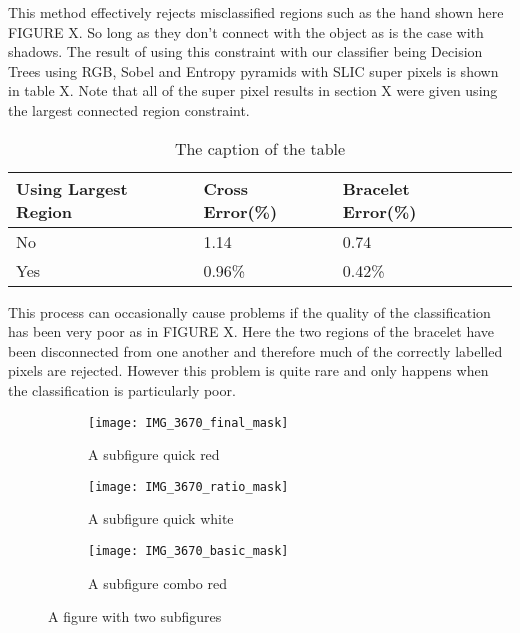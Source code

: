 \documentclass[12pt]{IIBproject}
\begin{document}
This method effectively rejects misclassified regions such as the hand shown here FIGURE X. So long as they don't connect with the object as is the case with shadows. The result of using this constraint with our classifier being Decision Trees using RGB, Sobel and Entropy pyramids with SLIC super pixels is shown in table X. Note that all of the super pixel results in section X were given using the largest connected region constraint.
\begin{table}
\begin{center}
    \begin{tabular}{ | l | l | l | p{5cm} |}
    \hline
    Using Largest Region & Cross Error(\%) & Bracelet Error(\%) \\ \hline
    No & 1.14 & 0.74 \\ \hline
    Yes & 0.96\% & 0.42\% \\
    \hline
    
    \end{tabular}
    \caption{The caption of the table}\label{table:somename}
\end{center}
\end{table}
This process can occasionally cause problems if the quality of the classification has been very poor as in FIGURE X. Here the two regions of the bracelet have been disconnected from one another and therefore much of the correctly labelled pixels are rejected. However this problem is quite rare and only happens when the classification is particularly poor. 

\begin{figure}[H]
\centering
\begin{subfigure}{.5\textwidth}
  \centering
  \texttt{[image: IMG\_3670\_final\_mask]}
  \caption{A subfigure quick red}
  \label{fig:sub2}
\end{subfigure}
\begin{subfigure}{.5\textwidth}
  \centering
  \texttt{[image: IMG\_3670\_ratio\_mask]}
  \caption{A subfigure quick white}
  \label{fig:sub1}
\end{subfigure}%
\begin{subfigure}{.5\textwidth}
  \centering
  \texttt{[image: IMG\_3670\_basic\_mask]}
  \caption{A subfigure combo red}
  \label{fig:sub2}
\end{subfigure}

\caption{A figure with two subfigures}
\label{fig:test}
\end{figure}
\end{document}
